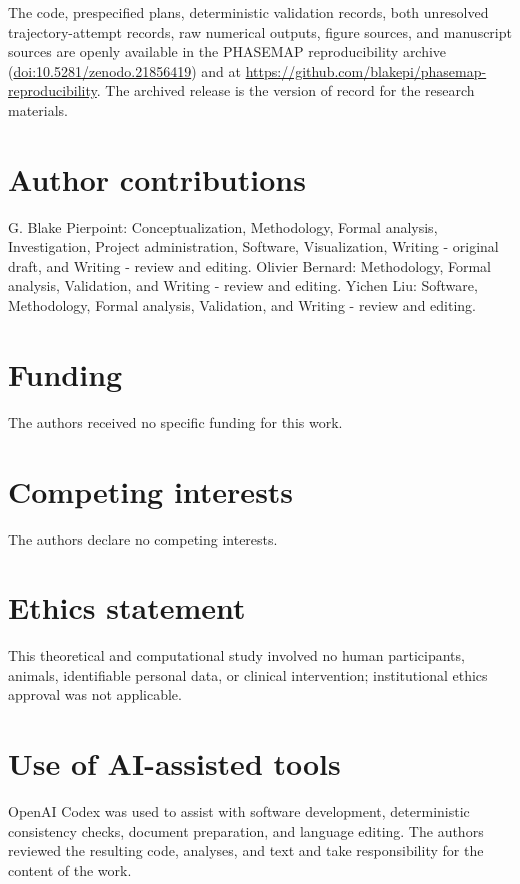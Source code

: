 The code, prespecified plans, deterministic validation records, both unresolved trajectory-attempt records, raw numerical outputs, figure sources, and manuscript sources are openly available in the PHASEMAP reproducibility archive (\href{https://doi.org/10.5281/zenodo.21856419}{doi:10.5281/zenodo.21856419}) and at \url{https://github.com/blakepi/phasemap-reproducibility}. The archived release is the version of record for the research materials.

\section{Author contributions}\label{author-contributions}

G. Blake Pierpoint: Conceptualization, Methodology, Formal analysis, Investigation, Project administration, Software, Visualization, Writing - original draft, and Writing - review and editing. Olivier Bernard: Methodology, Formal analysis, Validation, and Writing - review and editing. Yichen Liu: Software, Methodology, Formal analysis, Validation, and Writing - review and editing.

\section{Funding}\label{funding}

The authors received no specific funding for this work.

\section{Competing interests}\label{competing-interests}

The authors declare no competing interests.

\section{Ethics statement}\label{ethics-statement}

This theoretical and computational study involved no human participants, animals, identifiable personal data, or clinical intervention; institutional ethics approval was not applicable.

\section{Use of AI-assisted tools}\label{use-of-ai-assisted-tools}

OpenAI Codex was used to assist with software development, deterministic consistency checks, document preparation, and language editing. The authors reviewed the resulting code, analyses, and text and take responsibility for the content of the work.

